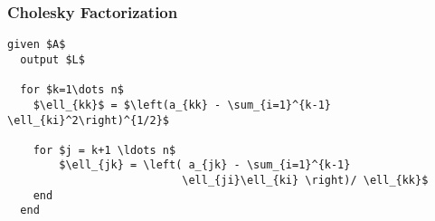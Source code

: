 \documentclass[10pt]{beamer}
\begin{document}
\begin{frame}[fragile]
\frametitle{Cholesky Factorization}
\begin{lstlisting}[mathescape,caption=Cholesky,label=algo:chol]
  given $A$
  output $L$
                               
  for $k=1\dots n$          
    $\ell_{kk}$ = $\left(a_{kk} - \sum_{i=1}^{k-1} \ell_{ki}^2\right)^{1/2}$

    for $j = k+1 \ldots n$      
        $\ell_{jk} = \left( a_{jk} - \sum_{i=1}^{k-1}
                           \ell_{ji}\ell_{ki} \right)/ \ell_{kk}$
    end
  end                          
\end{lstlisting}

\end{frame}

%
%
\end{document}
